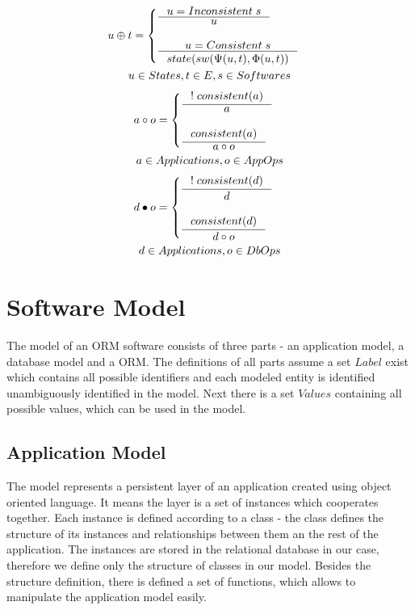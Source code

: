 \documentclass[11pt]{article}
\begin{document}
\begin{gather*}
 u \oplus t = \begin{cases}
 	\inference{u = Inconsistent \; s}{u} \\ \\
 	\inference{u = Consistent \; s}{state(sw(\Psi(u, t), \Phi(u,t))} 
\end{cases}\\ 
u \in States, t \in E, s \in Softwares
\end{gather*}
\begin{gather*}
 a \circ o = \begin{cases}
 	\inference{!\;consistent(a)}{a} \\ \\
 	\inference{consistent(a)}{a \circ o} 
\end{cases}\\ 
a \in Applications, o \in AppOps
\end{gather*}
\begin{gather*}
 d \bullet o = \begin{cases}
 	\inference{!\;consistent(d)}{d} \\ \\
 	\inference{consistent(d)}{d \circ o} 
\end{cases}\\ 
d \in Applications, o \in DbOps
\end{gather*}

\section{Software Model}
The model of an ORM software consists of three parts - an application model, a database model and a ORM. The definitions of all parts assume a set $Label$ exist which contains all possible identifiers and each modeled entity is identified unambiguously identified in the model. Next there is a set $Values$ containing all possible values, which can be used in the model. 

\subsection{Application Model}
\label{sec:appModel}
The model represents a persistent layer of an application created using object oriented language. It means the layer is a set of instances which cooperates together. Each instance is defined according to a class - the class defines the structure of its instances and relationships between them an the rest of the application. The instances are stored in the relational database in our case, therefore we define only the structure of classes in our model. Besides the structure definition, there is defined a set of functions, which allows to manipulate the application model easily. 
\end{document}
